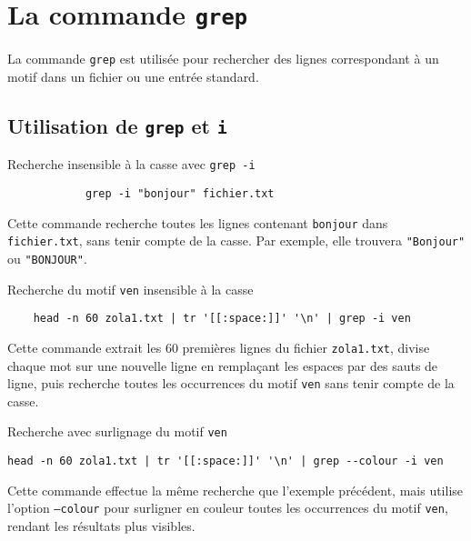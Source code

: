 \documentclass[a4paper]{report}
\begin{document}
    \section{La commande \texttt{grep}}
    \begin{Définition}
        La commande \texttt{grep} est utilisée pour rechercher des lignes correspondant
        à un motif dans un fichier ou une entrée standard.
    \end{Définition}
    \subsection{Utilisation de \texttt{grep} et \texttt{i}}


    \begin{EExample}{Recherche insensible à la casse avec \texttt{grep -i}}{}
        \begin{verbatim}
            grep -i "bonjour" fichier.txt
        \end{verbatim}
        Cette commande recherche toutes les lignes contenant \texttt{bonjour} 
        dans \texttt{fichier.txt}, sans tenir compte de la casse. Par exemple, 
        elle trouvera \texttt{"Bonjour"} ou \texttt{"BONJOUR"}.
    \end{EExample}



    \begin{EExample}{Recherche du motif \texttt{ven} insensible à la casse}{}
        \begin{verbatim}
    head -n 60 zola1.txt | tr '[[:space:]]' '\n' | grep -i ven
        \end{verbatim}
        Cette commande extrait les 60 premières lignes du fichier \texttt{zola1.txt},
        divise chaque mot sur une nouvelle ligne en remplaçant les espaces par des 
        sauts de ligne, puis recherche toutes les occurrences du motif \texttt{ven}
        sans tenir compte de la casse.
    \end{EExample}

    \begin{EExample}{Recherche avec surlignage du motif \texttt{ven}}{}
        \begin{verbatim}
head -n 60 zola1.txt | tr '[[:space:]]' '\n' | grep --colour -i ven
        \end{verbatim}
        Cette commande effectue la même recherche que l'exemple précédent, mais 
        utilise l'option \texttt{--colour} pour surligner en couleur toutes les 
        occurrences du motif \texttt{ven}, rendant les résultats plus visibles.
    \end{EExample}
\end{document}
